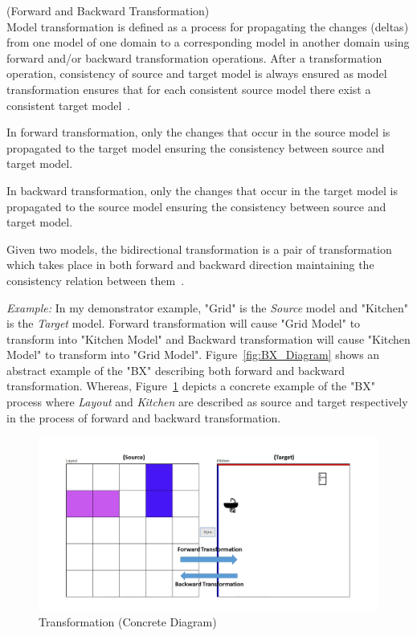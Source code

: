 \begin{defn}\label{deffwdbkdtrans} (Forward and Backward Transformation)\\
Model transformation is defined as a process for propagating the changes (deltas) from one model of one domain to a corresponding model in another domain using forward and/or backward transformation operations. After a transformation operation, consistency of source and target model is always ensured as model transformation ensures that for each consistent source model there exist a consistent target model~\cite{modelsynchro-tgg}.

In forward transformation, only the changes that occur in the source model is propagated to the target model ensuring the consistency between source and target model.

In backward transformation, only the changes that occur in the target model is propagated to the source model ensuring the consistency between source and target model.

Given two models, the bidirectional transformation is a pair of transformation which takes place in both forward and backward direction maintaining the consistency relation between them~\cite{understanding-bx}.
\end{defn}

\textit{Example:} In my demonstrator example, "Grid" is the \textit{Source} model and "Kitchen" is the \textit{Target} model. Forward transformation will cause "Grid Model" to transform into "Kitchen Model" and Backward transformation will cause "Kitchen Model" to transform into "Grid Model".
Figure~\ref{fig:BX_Diagram} shows an abstract example of the "BX" describing both forward and backward transformation. Whereas, Figure~\ref{fig:Transformation_Concrete} depicts a concrete example of the "BX" process where \textit{Layout} and \textit{Kitchen} are described as source and target respectively in the process of forward and backward transformation.

\begin{figure}
	\centering
	\includegraphics[width=1\textwidth]{figures/Transformation_Concrete}
	\caption{Transformation (Concrete Diagram)}
	\label{fig:Transformation_Concrete}
\end{figure}
